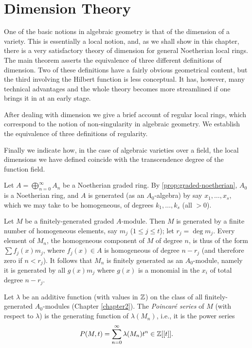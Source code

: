 \chapter{Dimension Theory}\label{chapter11}

One of the basic notions in algebraic geometry is that of the dimension of a variety. This is essentially a local notion, and, as we shall show in this chapter, there is a very satisfactory theory of dimension for general Noetherian local rings. The main theorem asserts the equivalence of three different definitions of dimension. Two of these definitions have a fairly obvious geometrical content, but the third involving the Hilbert function is less conceptual. It has, however, many technical advantages and the whole theory becomes more streamlined if one brings it in at an early stage.

After dealing with dimension we give a brief account of regular local rings, which correspond to the notion of non-singularity in algebraic geometry. We establish the equivalence of three definitions of regularity.

Finally we indicate how, in the case of algebraic varieties over a field, the local dimensions we have defined coincide with the transcendence degree of the function field.

Let $A = \bigoplus_{n=0}^\infty A_n$ be a Noetherian graded ring. By \eqref{prop:graded-noetherian}, $A_0$ is a Noetherian ring, and $A$ is generated (as an $A_0$-algebra) by say $x_1, \ldots, x_s$, which we may take to be homogeneous, of degrees $k_1, \ldots, k_s$ (all $> 0$).

Let $M$ be a finitely-generated graded $A$-module. Then $M$ is generated by a finite number of homogeneous elements, say $m_j$ ($1 \leq j \leq t$); let $r_j = \deg m_j$. Every element of $M_n$, the homogeneous component of $M$ of degree $n$, is thus of the form $\sum f_j(x)m_j$, where $f_j(x) \in A$ is homogeneous of degree $n - r_j$ (and therefore zero if $n < r_j$). It follows that $M_n$ is finitely generated as an $A_0$-module, namely it is generated by all $g(x)m_j$ where $g(x)$ is a monomial in the $x_i$ of total degree $n - r_j$.

Let $\lambda$ be an additive function (with values in $\mathbb{Z}$) on the class of all finitely-generated $A_0$-modules (Chapter \ref{chapter2}). The \emph{Poincar\'e series} of $M$ (with respect to $\lambda$) is the generating function of $\lambda(M_n)$, i.e., it is the power series
\[
    P(M, t) = \sum_{n=0}^\infty \lambda(M_n)t^n \in \mathbb{Z}[[t]].
\]

